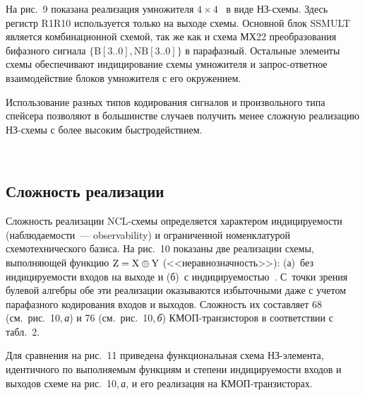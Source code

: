 \begin{multicols}{2}
       На рис.~9 показана реализация умножителя $4\times4$~\cite{55-sok} в виде 
       НЗ-схе\-мы. Здесь регистр R1R10 используется только на выходе схемы. Основной 
блок SSMULT является комбинационной схемой, так же как и схема МХ22 преобразования 
бифазного сигнала $\{\mathrm{B}[3..0], \mathrm{NB}[3..0]\}$ в парафазный. Остальные 
элементы схемы обеспечивают индицирование схемы умножителя и запрос-от\-вет\-ное 
взаимодействие блоков умножителя с его окружением.


       
       Использование разных типов кодирования сигналов и произвольного типа спейсера 
позволяют в большинстве случаев получить менее сложную реализацию НЗ-схе\-мы с более 
высоким быстродействием.

\begin{figure*} %
             \vspace*{1pt}
 \begin{center}
 \mbox{%
 \epsfxsize=110.505mm
 }
 \end{center}
 \vspace*{-9pt}
\end{figure*}
       
\vspace*{-3pt}
       \subsection{Сложность реализации}
       
       \vspace*{-2pt}
       
       Сложность реализации NCL-схе\-мы определяется характером индицируемости 
(наблюдаемости~--- observability) и ограниченной номенклатурой схемотехнического базиса. 
На рис.~10 показаны две реализации схемы, выполняющей функцию $\mathrm{Z}\hm= 
\mathrm{X}\oplus \mathrm{Y}$ (<<неравнозначность>>): (а)~без индицируемости входов на 
выходе и (б)~с ин\-ди\-ци\-ру\-емостью~\cite{68-sok}. С~точки зрения булевой алгебры обе эти 
реализации оказываются избыточными даже с учетом парафазного кодирования входов и 
выходов. Сложность их составляет 68 (см.\ рис.~10,\,\textit{а}) и 76 (см.\ рис.~10,\,\textit{б}) 
       КМОП-тран\-зис\-то\-ров в соответствии с табл.~2.
       
       Для сравнения на рис.~11 приведена функциональная схема НЗ-эле\-мен\-та, 
идентичного по выполняемым функциям и степени индицируемости входов и выходов схеме 
на рис.~10,\,\textit{а}, и его реализация на КМОП-тран\-зис\-то\-рах. 
       

\end{multicols}
